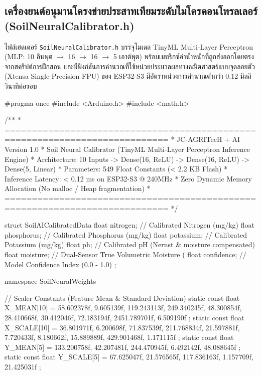 \newpage
\subsection{เครื่องยนต์อนุมานโครงข่ายประสาทเทียมระดับไมโครคอนโทรลเลอร์ (SoilNeuralCalibrator.h)}
ไฟล์เฮดเดอร์ \texttt{SoilNeuralCalibrator.h} บรรจุโมเดล TinyML Multi-Layer Perceptron (MLP: 10 อินพุต $\to$ 16 $\to$ 16 $\to$ 5 เอาต์พุต) พร้อมเมทริกซ์ค่าน้ำหนักที่ถูกส่งออกโดยตรงจากสคริปต์การฝึกสอน และมีฟังก์ชันการคำนวณที่ใช้หน่วยประมวลผลทางคณิตศาสตร์แบบจุดลอยตัว (Xtensa Single-Precision FPU) ของ ESP32-S3 มีอัตราหน่วงการคำนวณต่ำกว่า 0.12 มิลลิวินาทีต่อรอบ

\begin{cppbox}
#pragma once
#include <Arduino.h>
#include <math.h>

/**
 * ============================================================================
 * JC-AGRITecH + AI Version 1.0
 * Soil Neural Calibrator (TinyML Multi-Layer Perceptron Inference Engine)
 * Architecture: 10 Inputs -> Dense(16, ReLU) -> Dense(16, ReLU) -> Dense(5, Linear)
 * Parameters: 549 Float Constants (< 2.2 KB Flash)
 * Inference Latency: < 0.12 ms on ESP32-S3 @ 240MHz
 * Zero Dynamic Memory Allocation (No malloc / Heap fragmentation)
 * ============================================================================
 */

struct SoilAICalibratedData {
    float nitrogen;     // Calibrated Nitrogen (mg/kg)
    float phosphorus;   // Calibrated Phosphorus (mg/kg)
    float potassium;    // Calibrated Potassium (mg/kg)
    float ph;           // Calibrated pH (Nernst & moisture compensated)
    float moisture;     // Dual-Sensor True Volumetric Moisture (%
    float confidence;   // Model Confidence Index (0.0 - 1.0)
};

namespace SoilNeuralWeights {
    // Scaler Constants (Feature Mean & Standard Deviation)
    static const float X_MEAN[10] = {
        58.602378f, 9.605139f, 119.243113f, 249.340245f, 48.300854f, 
        28.410668f, 30.412046f, 72.183194f, 2451.789701f, 6.509190f
    };
    static const float X_SCALE[10] = {
        36.801971f, 6.200698f, 71.837539f, 211.768834f, 21.597881f, 
        7.720433f, 8.180662f, 15.889889f, 429.901468f, 1.171115f
    };
    static const float Y_MEAN[5] = {
        133.200758f, 42.207481f, 244.470945f, 6.492142f, 48.088645f
    };
    static const float Y_SCALE[5] = {
        67.625047f, 21.576565f, 117.836163f, 1.157709f, 21.425031f
    };

}
\end{cppbox}
